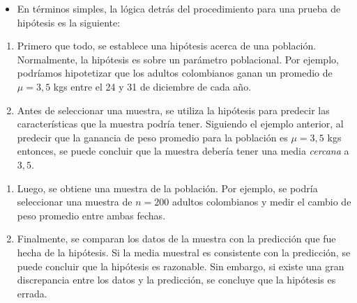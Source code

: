 \documentclass{beamer}
\newcounter{saveenumi}
\newcommand{\seti}{\setcounter{saveenumi}{\value{enumi}}}
\newcommand{\conti}{\setcounter{enumi}{\value{saveenumi}}}
\begin{document}
\begin{frame}
\begin{itemize}
\justifying
\item En términos simples, la lógica detrás del procedimiento para una prueba de hipótesis es la siguiente:
\end{itemize}
\begin{enumerate}
	\justifying
	\item Primero que todo, se establece una hipótesis acerca de una población. Normalmente, la hipótesis es sobre un parámetro poblacional. Por ejemplo, podríamos hipotetizar que los adultos colombianos ganan un promedio de $\mu=3,5$ kgs entre el 24 y 31 de diciembre de cada año.
\item Antes de seleccionar una muestra, se utiliza la hipótesis para predecir las características que la muestra podría tener. Siguiendo el ejemplo anterior, al predecir que la ganancia de peso promedio para la población es $\mu=3,5$ kgs entonces, se puede concluir que la muestra debería tener una media \emph{cercana} a $3,5$.
\seti
\end{enumerate}
\end{frame}

\begin{frame}
\begin{enumerate}
\conti
\justifying
\item Luego, se obtiene una muestra de la población. Por ejemplo, se podría seleccionar una muestra de $n=200$ adultos colombianos  y medir el cambio de peso promedio entre ambas fechas.
\item Finalmente, se comparan los datos de la muestra con la predicción que fue hecha de la hipótesis. Si la media muestral es consistente con la predicción, se puede concluir que la hipótesis es razonable. Sin embargo, si existe una gran discrepancia entre los datos y la predicción, se concluye que la hipótesis es errada. 
\end{enumerate}
\end{frame}
\end{document}
